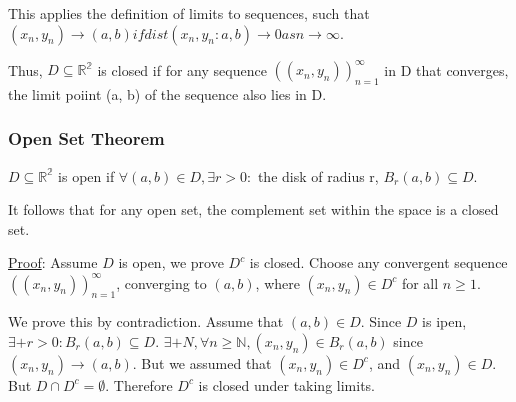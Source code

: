 \documentclass[11 pt, twoside]{article}
\begin{document}
This applies the definition of limits to sequences, such that $(x_n, y_n) \to (a, b) if dist(x_n, y_n: a, b) \to 0 as n \to \infty$.

Thus, $D \subseteq \mathbb{R^2}$ is closed if for any sequence $((x_n, y_n))^\infty_{n=1}$ in D that converges, the limit poiint (a, b) of the sequence also lies in D.

\subsubsection{Open Set Theorem}
$D \subseteq \mathbb{R^2}$ is open if $\forall (a, b) \in D, \exists r > 0:$ the disk of radius r, $B_r(a, b) \subseteq D$.

It follows that for any open set, the complement set within the space is a closed set.

\underline{Proof}:
Assume $D$ is open, we prove $D^c$ is closed. Choose any convergent sequence
$((x_n, y_n))_{n = 1}^\infty$, converging to $(a, b)$, where $(x_n, y_n) \in
D^c$ for all $n \geq 1$.

We prove this by contradiction. Assume that $(a, b) \in D$. Since $D$ is ipen,
$\exists+ r > 0:B_r(a, b)\subseteq D$. $\exists+ N, \forall n \geq
\mathbb{N}, (x_n, y_n) \in B_r(a, b)$ since $(x_n, y_n)\to(a,b)$. But we
assumed that $(x_n, y_n) \in D^c$, and $(x_n, y_n) \in D$. But $D \cap D^c =
\emptyset$. Therefore $D^c$ is closed under taking limits.
\end{document}
